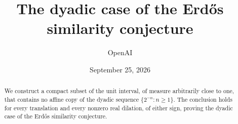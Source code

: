 \documentclass[11pt]{article}
\title{The dyadic case of the Erd\H{o}s similarity conjecture}
\author{OpenAI}
\date{September 25, 2026}
\theoremstyle{definition}
\theoremstyle{remark}
\begin{document}
\maketitle
\begin{abstract}
We construct a compact subset of the unit interval, of measure arbitrarily
close to one, that contains no affine copy of the dyadic sequence
$\{2^{-n}:n\ge1\}$. The conclusion holds for every translation and every
nonzero real dilation, of either sign, proving the dyadic case of the
Erd\H{o}s similarity conjecture.
\end{abstract}
\tableofcontents










\end{document}
